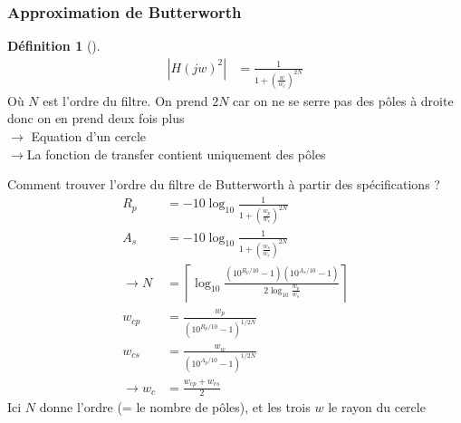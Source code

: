 \documentclass{article}
\theoremstyle{plain}%
\theoremstyle{definition}
\newtheorem{defn}{Définition}[section]
\theoremstyle{remark}
\begin{document}
\subsubsection{Approximation de Butterworth}
\begin{defn}[]
    \begin{align*}
        \left| H(jw)^2 \right| &= \frac{1}{1+ (\frac{w}{w_c})^{2N}}
    \end{align*}
    Où $ N $ est l'ordre du filtre. On prend $ 2N $ car on ne se serre pas des pôles à droite donc on en prend deux fois plus \\
    $\rightarrow$ Equation d'un cercle \\
    $\rightarrow$La fonction de transfer contient uniquement des pôles
\end{defn}
Comment trouver l'ordre du filtre de Butterworth à partir des spécifications ?
\begin{align*}
    R_p &= -10 \log_{10} \frac{1}{1 + (\frac{w_p}{w_c})^{2N}} \\
    A_s &= -10 \log_{10} \frac{1}{1 + (\frac{w_s}{w_c})^{2N}} \\
    \rightarrow N &= \left\lceil \log_{10} \frac{(10^{R_p/10} - 1)(10^{A_s/10} - 1)}{2 \log_{10} \frac{w_p}{w_s}}\right\rceil \\
    w_{cp} &= \frac{w_p}{(10^{R_p/10} - 1)^{1/2N}} \\
    w_{cs} &= \frac{w_w}{(10^{A_p/10} - 1)^{1/2N}} \\
    \rightarrow w_c &= \frac{w_{cp} + w_{cs}}{2}
\end{align*}
Ici $ N $ donne l'ordre (= le nombre de pôles), et les trois $ w $ le rayon du cercle 
\end{document}
